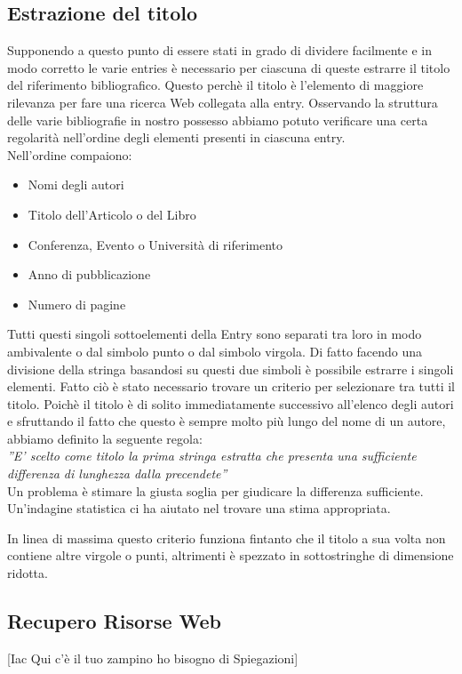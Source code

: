 \subsection{Estrazione del titolo}
Supponendo a questo punto di essere stati in grado di dividere facilmente e in modo corretto le varie entries è necessario per ciascuna di queste estrarre il titolo del riferimento bibliografico. Questo perchè il titolo è l'elemento di maggiore rilevanza per fare una ricerca Web collegata alla entry. Osservando la struttura delle varie bibliografie in nostro possesso abbiamo potuto verificare una certa regolarità nell'ordine degli elementi presenti in ciascuna entry.
\\
Nell'ordine compaiono:
\begin{itemize}
 \item Nomi degli autori
 \item Titolo dell'Articolo o del Libro
 \item Conferenza, Evento o Università di riferimento
 \item Anno di pubblicazione
 \item Numero di pagine
\end{itemize}

Tutti questi singoli sottoelementi della Entry sono separati tra loro in modo ambivalente o dal simbolo punto o dal simbolo virgola. Di fatto facendo una divisione della stringa basandosi su questi due simboli è possibile estrarre i singoli elementi. Fatto ciò è stato necessario trovare un criterio per selezionare tra tutti il titolo.
Poichè il titolo è di solito immediatamente successivo all'elenco degli autori e sfruttando il fatto che questo è sempre molto più lungo del nome di un autore, abbiamo definito la seguente regola:
\\
\textit{''E' scelto come titolo la prima stringa estratta che presenta una sufficiente differenza di lunghezza dalla precendete''}
\\

Un problema è stimare la giusta soglia per giudicare la differenza sufficiente. Un'indagine statistica ci ha aiutato nel trovare una stima appropriata.

In linea di massima questo criterio funziona fintanto che il titolo a sua volta non contiene altre virgole o punti, altrimenti è spezzato in sottostringhe di dimensione ridotta.


\subsection{Recupero Risorse Web}
[Iac Qui c'è il tuo zampino ho bisogno di Spiegazioni]